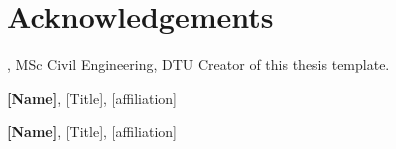 \section*{Acknowledgements}
\textbf{\thesisauthor}, MSc Civil Engineering, DTU \newline
Creator of this thesis template.

\textbf{[Name]}, [Title], [affiliation] \newline
[text]

\textbf{[Name]}, [Title], [affiliation] \newline
[text]

